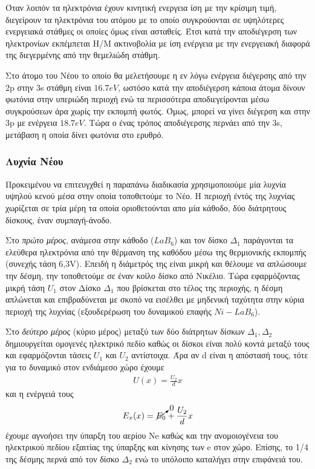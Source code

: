 \documentclass[a4paper]{article}
\begin{document}
	Όταν λοιπόν τα ηλεκτρόνια έχουν κινητική ενεργεια ίση με την κρίσιμη τιμή, διεγείρουν τα ηλεκτρόνια του ατόμου με το οποίο συγκρούονται σε υψηλότερες ενεργειακά στάθμες οι οποίες όμως είναι ασταθείς. Έτσι κατά την αποδιέγερση των ηλεκτρονίων εκπέμπεται Η/Μ ακτινοβολία με ίση ενέργεια με την ενεργειακή διαφορά της διεγερμένης από την θεμελιώδη στάθμη.
	
	Στο άτομο του Νέου το οποίο θα μελετήσουμε η εν λόγω ενέργεια διέγερσης από την 2p στην 3s στάθμη είναι $16.7eV$, ωστόσο κατά την αποδιέγερση κάποια άτομα δίνουν φωτόνια στην υπεριώδη περιοχή ενώ τα περισσότερα αποδιεγείρονται μέσω συγκρούσεων άρα χωρίς την εκπομπή φωτός. Όμως, μπορεί να γίνει διέγερση και στην 3p με ενέργεια $18.7eV$. Τώρα ο ένας τρόπος αποδιέγερσης περνάει από την 3s, μετάβαση η οποία δίνει φωτόνια στο ερυθρό.
	
	\subsubsection*{Λυχνία Νέου}
	
	Προκειμένου να επιτευγχθεί η παραπάνω διαδικασία χρησιμοποιούμε μία λυχνία υψηλού κενού μέσα στην οποία τοποθετούμε το Νέο. Η περιοχή έντός της λυχνίας χωρίζεται σε τρία μέρη τα οποία οριοθετούνται απο μία κάθοδο, δύο διάτρητους δίσκους, έναν συμπαγή-άνοδο.
	
	Στο \textit{πρώτο μέρος}, ανάμεσα στην κάθοδο ($LaB_6$) και τον δίσκο $\Delta_1$ παράγονται τα ελεύθερα ηλεκτρόνια από την θέρμανση της καθόδου μέσω της θερμιονικής εκπομπής (συνεχής τάση 6,3V). Επειδή η διάμετρός της είναι μικρή και θέλουμε να απλώσουμε την δέσμη, την τοποθετούμε σε έναν κοίλο δίσκο από Νικέλιο. Τώρα εφαρμόζοντας μικρή τάση $U_1$ στον Δίσκο $\Delta_1$ που βρίσκεται στο τέλος της περιοχής, η δέσμη απλώνεται και επιβραδύνεται με σκοπό να εισέλθει με μηδενική ταχύτητα στην κύρια περιοχή της λυχνίας (εξουδερέρωση του δυναμικού επαφής $Ni-LaB_6$).
	
	Στο \textit{δεύτερο μέρος} (κύριο μέρος) μεταξύ των δύο διάτρητων δίσκων $\Delta_1,\Delta_2$ δημιουργείται ομογενές ηλεκτρικό πεδίο καθώς οι δίσκοι είναι πολύ κοντά μεταξύ τους και εφαρμόζονται τάσεις $U_1$ και $U_2$ αντίστοιχα. Άρα αν d  είναι η απόστασή τους, τότε για το δυναμικό στον ενδιάμεσο χώρο έχουμε 
	\begin{align} \label{eq1}
		U(x) = \frac{U_2}{d}x
	\end{align}
	και η ενέργειά τους
	\begin{align}\label{eq2}
		E_x(x) = \cancelto{0}{E_0} +\frac{U_2}{d}x
	\end{align}
	έχουμε αγνοήσει την ύπαρξη του αερίου Ne καθώς και την ανομοιογένεια του ηλεκτρικού πεδίου εξαιτίας της ύπαρξης και κίνησης των e στον χώρο.
	Επίσης, το 1/4 της δέσμης περνά από τον δίσκο $\Delta_2$ ενώ το υπόλοιπο καταλήγει στην επιφάνειά του.
	
\end{document}
